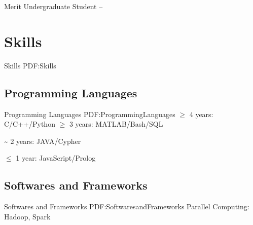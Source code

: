 \documentclass[letterpaper,10pt,oneside]{article}
\begin{document}
\begin{body}
\GapNoBreak
\BulletItem
Merit Undergraduate Student
\hfill
{} --





\iffalse
\section
{Languages}
{Languages}
{PDF:Languages}

\BulletItem
English: Native language.

\GapNoBreak
\BulletItem
Spanish: Fluent (speaking, reading, writing).

\GapNoBreak
\BulletItem
Latin: Intermediate (reading); basic (speaking, writing).
\fi

\section
{Skills}
{Skills}
{PDF:Skills}


\subsection
{Programming Languages}
{Programming Languages}
{PDF:ProgrammingLanguages}
\GapNoBreak
\BulletItem
$\geq$ 4 years: C/C++/Python
\GapNoBreak
\BulletItem
$\geq$ 3 years: MATLAB/Bash/SQL

\GapNoBreak
{} {\textasciitilde} 2 years: JAVA/Cypher

\GapNoBreak
\BulletItem
$\leq$ 1 year: JavaScript/Prolog
\BigGap
\GapNoBreak
\subsection
{Softwares and Frameworks}
{Softwares and Frameworks}
{PDF:SoftwaresandFrameworks}
\GapNoBreak
\BulletItem
Parallel Computing: Hadoop, Spark


\end{body}
\end{document}
